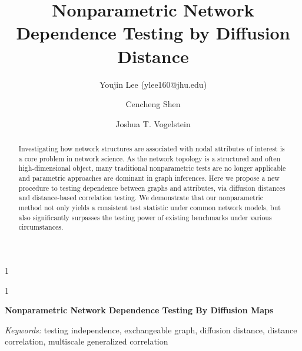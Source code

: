 \documentclass[11pt]{article}
\theoremstyle{definition}
\newcommand{\blind}{1}
\begin{document}
\def\spacingset#1{\renewcommand{\baselinestretch}%
{#1}\small\normalsize} \spacingset{1}

\title{\bf Nonparametric Network Dependence Testing by Diffusion Distance}
\blind
{\author[1]{Youjin Lee (ylee160@jhu.edu)} %
	\author[2]{Cencheng Shen} %
	\author[2,3,4]{Joshua T. Vogelstein}
	\maketitle
} \fi

	\blind
	{
		\bigskip
		\bigskip
		\bigskip
		\begin{center}
			{\LARGE\bf Nonparametric Network Dependence Testing By Diffusion Maps}
		\end{center}
		\medskip
	} \fi

\begin{abstract}
Investigating how network structures are associated with nodal attributes of interest is a core problem in network science. As the network topology is a structured and often high-dimensional object, many traditional nonparametric tests are no longer applicable and parametric approaches are dominant in graph inferences. Here we propose a new procedure to testing dependence between graphs and attributes, via diffusion distances and distance-based correlation testing. We demonstrate that our nonparametric method not only yields a consistent test statistic under common network models, but also significantly surpasses the testing power of existing benchmarks under various circumstances. 
\end{abstract}

\noindent%
{\it Keywords:} testing independence, exchangeable graph, diffusion distance, distance correlation, multiscale generalized correlation

\sloppy
\doublespacing
\end{document}
